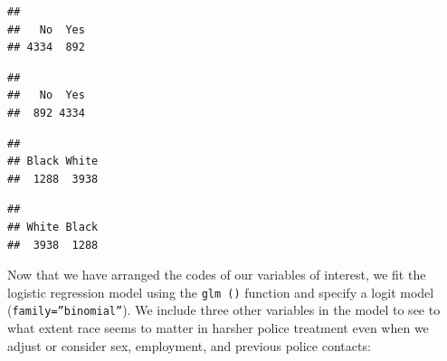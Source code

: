 \documentclass[
]{book}
\newenvironment{Shaded}{\begin{snugshade}}{\end{snugshade}}
\newcommand{\CommentTok}[1]{\textcolor[rgb]{0.56,0.35,0.01}{\textit{#1}}}
\newcommand{\FunctionTok}[1]{\textcolor[rgb]{0.00,0.00,0.00}{#1}}
\newcommand{\NormalTok}[1]{#1}
\newcommand{\OtherTok}[1]{\textcolor[rgb]{0.56,0.35,0.01}{#1}}
\newcommand{\SpecialCharTok}[1]{\textcolor[rgb]{0.00,0.00,0.00}{#1}}
\newcommand{\StringTok}[1]{\textcolor[rgb]{0.31,0.60,0.02}{#1}}
\begin{document}
\begin{verbatim}
## 
##   No  Yes 
## 4334  892
\end{verbatim}

\begin{Shaded}
\end{Shaded}

\begin{verbatim}
## 
##   No  Yes 
##  892 4334
\end{verbatim}

\begin{Shaded}
\end{Shaded}

\begin{verbatim}
## 
## Black White 
##  1288  3938
\end{verbatim}

\begin{Shaded}
\end{Shaded}

\begin{verbatim}
## 
## White Black 
##  3938  1288
\end{verbatim}

Now that we have arranged the codes of our variables of interest, we fit the logistic regression model using the \texttt{glm\ ()} function and specify a logit model (\texttt{family=”binomial”}). We include three other variables in the model to see to what extent race seems to matter in harsher police treatment even when we adjust or consider sex, employment, and previous police contacts:
\end{document}
